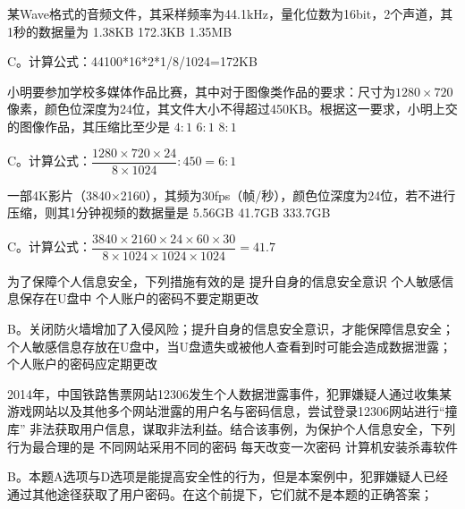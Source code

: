 \begin{groups}


\begin{questions}[rp]

\question
{}某Wave格式的音频文件，其采样频率为44.1kHz，量化位数为16bit，2个声道，其1秒的数据量为
{1.38KB}
{172.3KB}
{1.35MB}
\begin{solution}
C。计算公式：44100*16*2*1/8/1024=172KB
\end{solution}

\question
{}小明要参加学校多媒体作品比赛，其中对于图像类作品的要求：尺寸为$1280 \times 720$像素，颜色位深度为24位，其文件大小不得超过450KB。根据这一要求，小明上交的图像作品，其压缩比至少是
{$4:1$}
{$6:1$}
{$8:1$}
\begin{solution}
C。计算公式：$\dfrac{1280 \times 720 \times 24}{8 \times 1024} : 450=6:1$
\end{solution}

\question
{}一部4K影片（3840×2160），其频为30fps（帧/秒），颜色位深度为24位，若不进行压缩，则其1分钟视频的数据量是
{5.56GB}
{41.7GB}
{333.7GB}
\begin{solution}
C。计算公式：$\dfrac{3840 \times 2160 \times 24 \times 60 \times 30}{8 \times 1024 \times 1024 \times 1024}=41.7$
\end{solution}

\question
{}为了保障个人信息安全，下列措施有效的是
{提升自身的信息安全意识}
{个人敏感信息保存在U盘中}
{个人账户的密码不要定期更改}
\begin{solution}
B。关闭防火墙增加了入侵风险；提升自身的信息安全意识，才能保障信息安全；个人敏感信息存放在U盘中，当U盘遗失或被他人查看到时可能会造成数据泄露；个人账户的密码应定期更改
\end{solution}

\question
{}2014年，中国铁路售票网站12306发生个人数据泄露事件，犯罪嫌疑人通过收集某游戏网站以及其他多个网站泄露的用户名与密码信息，尝试登录12306网站进行“撞库” 非法获取用户信息，谋取非法利益。结合该事例，为保护个人信息安全，下列行为最合理的是
{不同网站采用不同的密码}
{每天改变一次密码}
{计算机安装杀毒软件}
\begin{solution}
B。本题A选项与D选项是能提高安全性的行为，但是本案例中，犯罪嫌疑人已经
通过其他途径获取了用户密码。在这个前提下，它们就不是本题的正确答案；


\end{solution}
\end{questions}
\end{groups}
